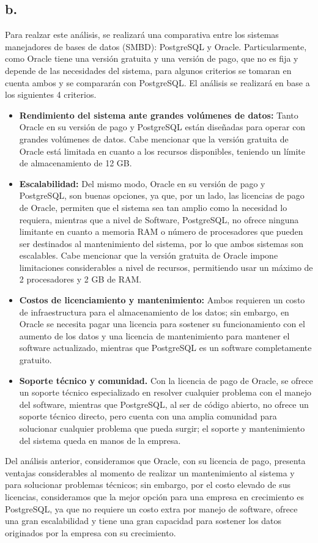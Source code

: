 \subsection*{b.}

Para realzar este análisis, se realizará una comparativa entre los sistemas manejadores de bases de datos (SMBD): PostgreSQL y Oracle. Particularmente, como Oracle tiene una versión gratuita y una versión de pago, que no es fija y depende de las necesidades del sistema, para algunos criterios se tomaran en cuenta ambos y se compararán con PostgreSQL. El análisis se realizará en base a los siguientes 4 criterios.\\
\begin{itemize}
\item \textbf{Rendimiento del sistema ante grandes volúmenes de datos:} Tanto Oracle en su versión de pago y PostgreSQL están diseñadas para operar con grandes volúmenes de datos. Cabe mencionar que la versión gratuita de Oracle está limitada en cuanto a los recursos disponibles, teniendo un límite de almacenamiento de 12 GB.
\item \textbf{Escalabilidad: } Del mismo modo, Oracle en su versión de pago y PostgreSQL, son buenas opciones, ya que, por un lado, las licencias de pago de Oracle, permiten que el sistema sea tan amplio como la necesidad lo requiera, mientras que a nivel de Software, PostgreSQL, no ofrece ninguna limitante en cuanto a memoria RAM o número de procesadores que pueden ser destinados al mantenimiento del sistema, por lo que ambos sistemas son escalables. Cabe mencionar que la versión gratuita de Oracle impone limitaciones considerables a nivel de recursos, permitiendo usar un máximo de 2 procesadores y 2 GB de RAM.
\item \textbf{Costos de licenciamiento y mantenimiento: } Ambos requieren un costo de infraestructura para el almacenamiento de los datos; sin embargo, en Oracle se necesita pagar una licencia para sostener su funcionamiento con el aumento de los datos y una licencia de mantenimiento para mantener el software actualizado, mientras que PostgreSQL es un software completamente gratuito.\
\item \textbf{Soporte técnico y comunidad.} Con la licencia de pago de Oracle, se ofrece un soporte técnico especializado en resolver cualquier problema con el manejo del software, mientras que PostgreSQL, al ser de código abierto, no ofrece un soporte técnico directo, pero cuenta con una amplia comunidad para solucionar cualquier problema que pueda surgir; el soporte y mantenimiento del sistema queda en manos de la empresa.
\end{itemize}
Del análisis anterior, consideramos que Oracle, con su licencia de pago, presenta ventajas considerables al momento de realizar un mantenimiento al sistema y para solucionar problemas técnicos; sin embargo, por el costo elevado de sus licencias, consideramos que la mejor opción para una empresa en crecimiento es PostgreSQL, ya que no requiere un costo extra por manejo de software, ofrece una gran escalabilidad y tiene una gran capacidad para sostener los datos originados por la empresa con su crecimiento.

